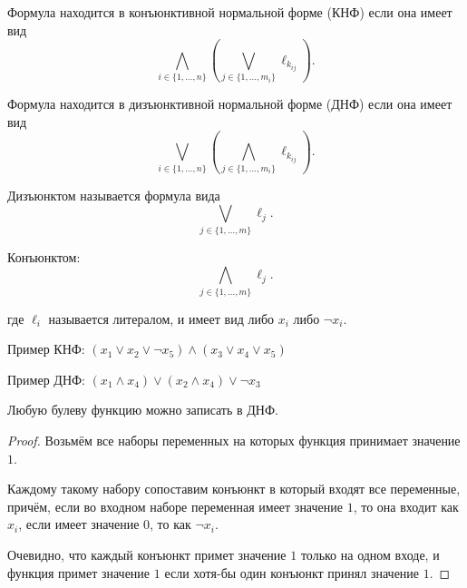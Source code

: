 \begin{example} \thmslashn

\end{example}


\begin{definition} \thmslashn 

    Формула находится в конъюнктивной нормальной форме (КНФ) если она имеет вид 
    \[ \bigwedge_{i\in \{1, \ldots, n\} } \left(\bigvee_{j\in \{1, \ldots, m_{i}\}} \ell_{k_{ij}}\right) .\]

    Формула находится в дизъюнктивной нормальной форме (ДНФ) если она имеет вид
    \[ \bigvee_{i\in \{1, \ldots, n\} } \left(\bigwedge_{j\in \{1, \ldots, m_{i}\}} \ell_{k_{ij}}\right) .\]

    Дизъюнктом называется формула вида
    \[ \bigvee_{j\in \{1, \ldots, m\} } \ell_{j} .\] 

    Конъюнктом:
    \[ \bigwedge_{j\in \{1, \ldots, m\} } \ell_{j} .\] 

    где $\ell_{i}$ называется литералом, и имеет вид либо $x_{i}$ либо $\neg x_{i}$.
        
\end{definition}

\begin{example} \thmslashn

    Пример КНФ: $(x_1 \lor x_2 \lor \neg x_5) \land (x_3 \lor x_4 \lor x_5)$

    Пример ДНФ: $(x_1 \land x_4) \lor (x_2 \land x_4) \lor \neg x_3$
\end{example}

\begin{theorem} \thmslashn

    Любую булеву функцию можно записать в ДНФ.

    \begin{proof} \thmslashn
    
        Возьмём все наборы переменных на которых функция принимает значение $1$.

        Каждому такому набору сопоставим конъюнкт в который входят все переменные, причём, если во входном наборе переменная имеет значение $1$, то она входит как $x_{i}$, если имеет значение $0$, то как $\neg x_{i}$.

        Очевидно, что каждый конъюнкт примет значение $1$ только на одном входе, и функция примет значение $1$ если хотя-бы один конъюнкт принял значение $1$.

    \end{proof}
\end{theorem}

